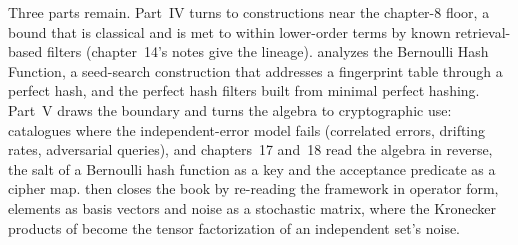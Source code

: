 Three parts remain. Part~IV turns to constructions near the chapter-8 floor, a
bound that is classical and is met to within lower-order terms by known
retrieval-based filters (chapter~14's notes give the lineage).
 analyzes the Bernoulli Hash Function, a
seed-search construction that addresses a fingerprint table through a perfect
hash, and  the perfect hash filters built from
minimal perfect hashing. Part~V draws the boundary and turns the algebra to
cryptographic use:  catalogues where the
independent-error model fails (correlated errors, drifting rates, adversarial
queries), and chapters~17 and~18 read the algebra in reverse, the salt of a
Bernoulli hash function as a key and the acceptance predicate as a cipher map.
 then closes the book by re-reading the
framework in operator form, elements as basis vectors and noise as a stochastic
matrix, where the Kronecker products of  become
the tensor factorization of an independent set's noise.
